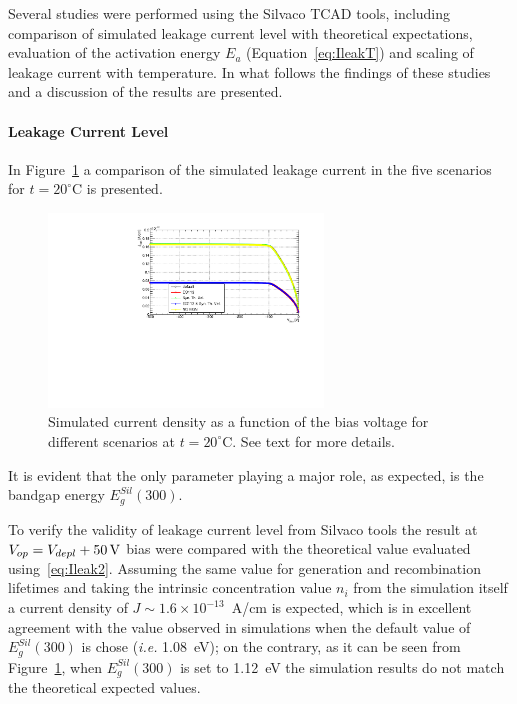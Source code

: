 Several studies were performed using the Silvaco TCAD tools,
 including comparison of simulated leakage current level with 
theoretical expectations,  evaluation of the activation energy $E_{a}$ (Equation~\ref{eq:IleakT}) 
and scaling of leakage current with temperature. In what follows the findings of these 
studies and a discussion of the results are presented.

\paragraph{Leakage Current Level}




In Figure~\ref{fig:ILeak20C} a comparison of the simulated leakage current in the five scenarios for $t=20^{\circ}$C is presented.
\begin{figure}[!htbp]
\centering
\includegraphics[width=0.65\textwidth]{currents_T20_scenarios.pdf}
\caption{\label{fig:ILeak20C}Simulated current density as a function of the bias voltage for different 
scenarios at $t=20^{\circ}$C. See text for more details.}
\end{figure}
It is evident that the only parameter playing a major role, as expected, is the bandgap energy $E^{Sil}_g(300)$. 



To verify the validity of leakage current level  from Silvaco tools the result at $V_{op}=V_{depl}+50\,{\rm V}$ 
bias 
were compared with the theoretical value evaluated using~\ref{eq:Ileak2}. Assuming the same value
for generation and recombination lifetimes and taking the intrinsic concentration value $n_i$ from 
the simulation itself a current density of $J\sim1.6\times10^{-13}$~A/cm is expected, which 
is in excellent agreement with the value observed in simulations when the default value of 
$E^{Sil}_g(300)$ is chose ({\it i.e.} 1.08~eV); on the contrary, as it can be seen from Figure~\ref{fig:ILeak20C}, when $E^{Sil}_g(300)$ is set to 1.12~eV the simulation results do not match 
the theoretical expected values.

